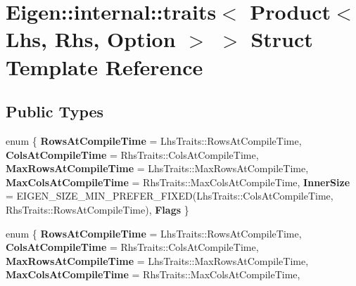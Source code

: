 \hypertarget{struct_eigen_1_1internal_1_1traits_3_01_product_3_01_lhs_00_01_rhs_00_01_option_01_4_01_4}{}\section{Eigen\+:\+:internal\+:\+:traits$<$ Product$<$ Lhs, Rhs, Option $>$ $>$ Struct Template Reference}
\label{struct_eigen_1_1internal_1_1traits_3_01_product_3_01_lhs_00_01_rhs_00_01_option_01_4_01_4}
\subsection*{Public Types}
\begin{DoxyCompactItemize}
\item 
\mbox{\label{struct_eigen_1_1internal_1_1traits_3_01_product_3_01_lhs_00_01_rhs_00_01_option_01_4_01_4_a69497e6334fd72bdd19f4c357a80258d}} 
enum \{ \newline
{\bfseries Rows\+At\+Compile\+Time} = Lhs\+Traits\+:\+:Rows\+At\+Compile\+Time, 
{\bfseries Cols\+At\+Compile\+Time} = Rhs\+Traits\+:\+:Cols\+At\+Compile\+Time, 
{\bfseries Max\+Rows\+At\+Compile\+Time} = Lhs\+Traits\+:\+:Max\+Rows\+At\+Compile\+Time, 
{\bfseries Max\+Cols\+At\+Compile\+Time} = Rhs\+Traits\+:\+:Max\+Cols\+At\+Compile\+Time, 
\newline
{\bfseries Inner\+Size} = E\+I\+G\+E\+N\+\_\+\+S\+I\+Z\+E\+\_\+\+M\+I\+N\+\_\+\+P\+R\+E\+F\+E\+R\+\_\+\+F\+I\+X\+ED(Lhs\+Traits\+:\+:Cols\+At\+Compile\+Time, Rhs\+Traits\+:\+:Rows\+At\+Compile\+Time), 
{\bfseries Flags}
 \}
\item 
\mbox{\label{struct_eigen_1_1internal_1_1traits_3_01_product_3_01_lhs_00_01_rhs_00_01_option_01_4_01_4_ae257ea97f696c07feefb6b9e294a1bab}} 
enum \{ \newline
{\bfseries Rows\+At\+Compile\+Time} = Lhs\+Traits\+:\+:Rows\+At\+Compile\+Time, 
{\bfseries Cols\+At\+Compile\+Time} = Rhs\+Traits\+:\+:Cols\+At\+Compile\+Time, 
{\bfseries Max\+Rows\+At\+Compile\+Time} = Lhs\+Traits\+:\+:Max\+Rows\+At\+Compile\+Time, 
{\bfseries Max\+Cols\+At\+Compile\+Time} = Rhs\+Traits\+:\+:Max\+Cols\+At\+Compile\+Time, 
\newline

\end{DoxyCompactItemize}

